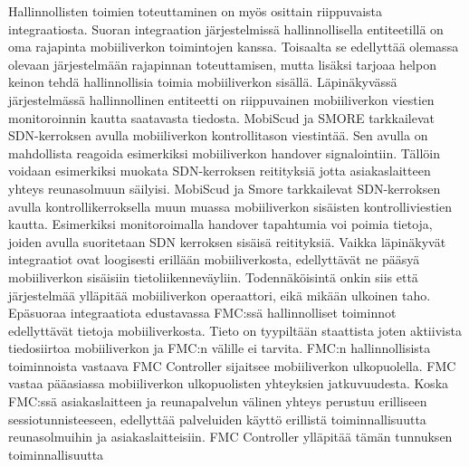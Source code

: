 Hallinnollisten toimien toteuttaminen on myös osittain riippuvaista integraatiosta. Suoran integraation järjestelmissä hallinnollisella entiteetillä on oma rajapinta mobiiliverkon toimintojen kanssa. 
Toisaalta se edellyttää olemassa olevaan järjestelmään rajapinnan toteuttamisen, mutta lisäksi tarjoaa helpon keinon tehdä hallinnollisia toimia mobiiliverkon sisällä. 
Läpinäkyvässä järjestelmässä hallinnollinen entiteetti on riippuvainen mobiiliverkon viestien monitoroinnin kautta saatavasta tiedosta. 
MobiScud ja SMORE tarkkailevat SDN-kerroksen avulla mobiiliverkon kontrollitason viestintää. 
Sen avulla on mahdollista reagoida esimerkiksi mobiiliverkon handover signalointiin. Tällöin voidaan esimerkiksi muokata SDN-kerroksen reitityksiä jotta asiakaslaitteen yhteys reunasolmuun säilyisi.
MobiScud ja Smore tarkkailevat SDN-kerroksen avulla kontrollikerroksella muun muassa mobiiliverkon sisäisten kontrolliviestien kautta. Esimerkiksi monitoroimalla handover tapahtumia voi poimia tietoja, joiden avulla suoritetaan SDN kerroksen sisäisä reitityksiä.
Vaikka läpinäkyvät integraatiot ovat loogisesti erillään mobiiliverkosta, edellyttävät ne pääsyä mobiiliverkon sisäisiin tietoliikenneväyliin.
Todennäköisintä onkin siis että järjestelmää ylläpitää mobiiliverkon operaattori, eikä mikään ulkoinen taho. 
Epäsuoraa integraatiota edustavassa FMC:ssä hallinnolliset toiminnot edellyttävät tietoja mobiiliverkosta. Tieto on tyypiltään staattista joten aktiivista tiedosiirtoa mobiiliverkon ja FMC:n välille ei tarvita. FMC:n hallinnollisista toiminnoista vastaava FMC Controller sijaitsee mobiiliverkon ulkopuolella. FMC vastaa pääasiassa mobiiliverkon ulkopuolisten yhteyksien jatkuvuudesta.
Koska FMC:ssä asiakaslaitteen ja reunapalvelun välinen yhteys perustuu erilliseen sessiotunnisteeseen, edellyttää palveluiden käyttö erillistä toiminnallisuutta reunasolmuihin ja asiakaslaitteisiin. FMC Controller ylläpitää tämän tunnuksen toiminnallisuutta

